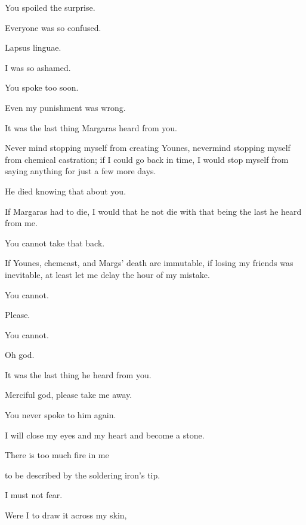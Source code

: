 \begin{paracol}{2}
\begin{leftcolumn}
\begin{ally}
You spoiled the surprise.
\end{ally}
Everyone was so confused.

\begin{ally}
Lapsus linguae.
\end{ally}
I was so ashamed.

\begin{ally}
You spoke too soon.
\end{ally}
Even my punishment was wrong.

\begin{ally}
It was the last thing Margaras heard from you.
\end{ally}
Never mind stopping myself from creating Younes, nevermind stopping myself from chemical castration; if I could go back in time, I would stop myself from saying anything for just a few more days.

\begin{ally}
He died knowing that about you.
\end{ally}
If Margaras had to die, I would that he not die with that being the last he heard from me.

\begin{ally}
You cannot take that back.
\end{ally}
If Younes, chemcast, and Margs' death are immutable, if losing my friends was inevitable, at least let me delay the hour of my mistake.

\begin{ally}
You cannot.
\end{ally}
Please.

\begin{ally}
You cannot.
\end{ally}
Oh god.

\begin{ally}
It was the last thing he heard from you.
\end{ally}
Merciful god, please take me away.

\begin{ally}
You never spoke to him again.
\end{ally}
I will close my eyes and my heart and become a stone.
\newpage

\noindent There is too much fire in me

to be described by the soldering iron's tip.

\begin{ally}
I must not fear.
\end{ally}
Were I to draw it across my skin,


\end{leftcolumn}
\end{paracol}
